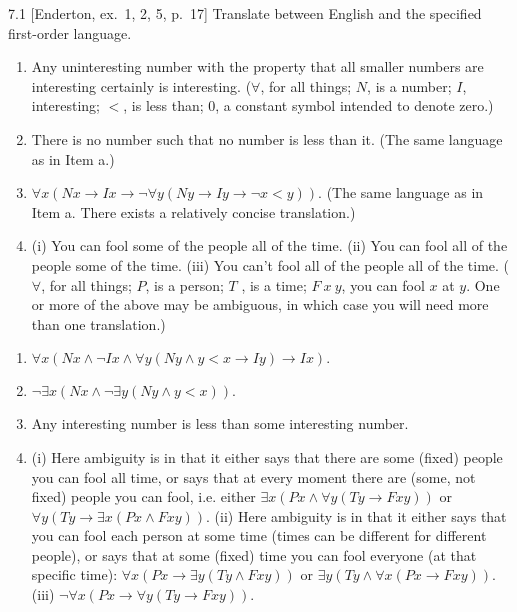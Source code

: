 
\begin{exercise}{7.1}
  [Enderton, ex.~1, 2, 5, p.~17]
  Translate between English and the specified first-order language.
  \begin{enumerate}[label=(\alph*)]
    \item Any uninteresting number with the property that all smaller numbers are interesting certainly is interesting. ($\forall$, for all things; $N$, is a number; $I$, interesting; $<$, is less than; $0$, a constant symbol intended to denote zero.)
    \item There is no number such that no number is less than it. (The same language as in Item a.)
    \item $\forall x(Nx\rightarrow Ix\rightarrow\neg\forall y(Ny\rightarrow Iy\rightarrow\neg x<y))$. (The same language as in Item a. There exists a relatively concise translation.)
    \item (i) You can fool some of the people all of the time. (ii) You can fool all of the people some of the time. (iii) You can’t fool all of the people all of the time. ($\forall$, for all things; $P$, is a person; $T$ , is a time; $F\ x\ y$, you can fool $x$ at $y$. One or more of the above may be ambiguous, in which case you will need more than one translation.)\qedhere
  \end{enumerate}
\end{exercise}

\begin{enumerate}[label=(\alph*)]
  \item $\forall x(Nx\wedge\neg Ix\wedge\forall y (Ny\wedge y<x\rightarrow Iy)\rightarrow Ix).$
  \item $\neg\exists x(Nx\wedge\neg\exists y(Ny\wedge y<x)).$
  \item Any interesting number is less than some interesting number.
  \item (i) Here ambiguity is in that it either says that there are some (fixed) people you can fool all time, or says that at every moment there are (some, not fixed) people you can fool, i.e. either $\exists x(Px\wedge\forall y(Ty\to Fxy))$ or $\forall y(Ty\to\exists x(Px\wedge Fxy))$. (ii) Here ambiguity is in that it either says that you can fool each person at some time (times can be different for different people), or says that at some (fixed) time you can fool everyone (at that specific time): $\forall x(Px\to\exists y(Ty\wedge Fxy))$ or $\exists y(Ty\wedge\forall x(Px\to Fxy))$. (iii) $\neg\forall x(Px\to\forall y(Ty\to Fxy)).$
\end{enumerate}

